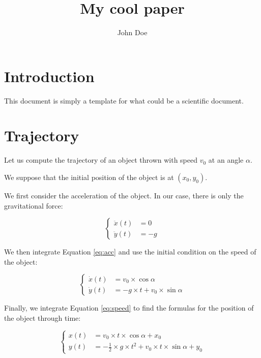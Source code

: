 \documentclass{article}
\title{My cool paper}
\author{John Doe}
\begin{document}
\maketitle

\section{Introduction}

This document is simply a template for what could be a scientific document.

\section{Trajectory}

Let us compute the trajectory of an object thrown with speed $v_0$ at an angle $\alpha$.

We suppose that the initial position of the object is at $(x_0, y_0)$.


We first consider the acceleration of the object.
In our case, there is only the gravitational force:

\begin{equation}\label{eq:acc}
    \begin{cases}
        \ddot{x}(t) &= 0 \\
        \ddot{y}(t) &= -g
    \end{cases}
\end{equation}

We then integrate Equation \ref{eq:acc} and use the initial condition on the speed of the object:

\begin{equation}\label{eq:speed}
    \begin{cases}
        \dot{x}(t) &= v_0 \times \cos \alpha \\
        \dot{y}(t) &= -g \times t + v_0 \times \sin \alpha
    \end{cases}
\end{equation}

Finally, we integrate Equation \ref{eq:speed} to find the formulas for the position of the object through time:

\begin{equation}
    \begin{cases}
        x(t) &= v_0 \times t \times \cos \alpha + x_0 \\
        y(t) &= -\frac{1}{2} \times g  \times t^2 + v_0 \times t \times \sin \alpha + y_0
    \end{cases}
\end{equation}
\end{document}

